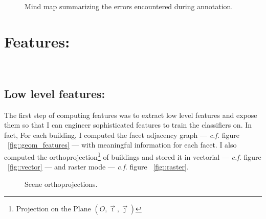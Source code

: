\documentclass[a4paper, 11pt]{article}
\begin{document}
	\begin{landscape}
		\begin{figure}
			\begin{center}
				
				\caption{\label{fig::mindmap_errors} Mind map summarizing the errors encountered during annotation.}
			\end{center}
		\end{figure}
	\end{landscape}

	\section{Features:}
~\\

	\subsection{Low level features:}


	The first step of computing features was to extract low level features and
	expose them so that I can engineer sophisticated features to train the
	classifiers on. In fact, For each building, I computed the facet adjacency
	graph --- \textit{c.f.} figure ~\ref{fig::geom_features} --- with meaningful
	information for each facet. I also computed the orthoprojection\footnote{Projection
	on the Plane $(O, \vec{\imath}, \vec{\jmath})$} of buildings and stored it
	in vectorial --- \textit{c.f.} figure ~\ref{fig::vector} --- and raster mode
	--- \textit{c.f.} figure ~\ref{fig::raster}.\\

	\begin{figure}[H]
		{
			\caption{\label{fig::ortho}Scene orthoprojections.}
		}
	\end{figure}
\end{document}
